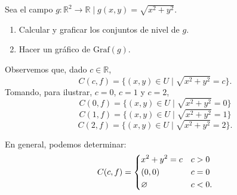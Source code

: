     
\begin{example} \label{example:ej2graf}  Sea  el campo  $g: \mathbb{R}^{2} \rightarrow \mathbb{R} \;|\; g(x,y) = \sqrt{x^2+y^2}.$
  \begin{enumerate}
    \item Calcular y graficar los conjuntos de nivel de $g$. 
    \item Hacer un gr\'afico de  $\text{Graf}(g)$.
  \end{enumerate}
Observemos que, dado $c \in \mathbb{R}$, 
     $$C(c,f)=\{(x,y) \in U \;|\;   \sqrt{x^2+y^2}  =c \}.$$
    Tomando, para ilustrar,  $c=0$, $c=1$ y $c=2$, 
    \[
        C(0,f)=\{(x,y) \in U \;|\; \sqrt{x^2+y^2}=0 \}
        \]
         \[
        C(1,f)=\{(x,y) \in U \;|\; \sqrt{x^2+y^2}=1 \}
        \]
         \[
        C(2,f)=\{(x,y) \in U \;|\; \sqrt{x^2+y^2}=2 \}.
         \]
    
    
  
    

     \begin{center}
        
    \end{center}
    
    En general, podemos determinar:
       \[
            C(c,f)=
            \begin{dcases}
               x^2+y^2=c  &  c>0 \\
    (0,0)  & c=0\\
    \varnothing  & c<0.\\
            \end{dcases}
        \]
   

\end{example}
